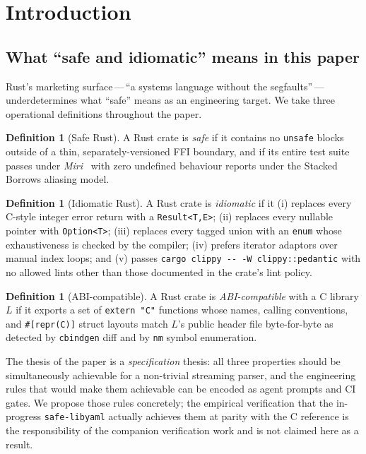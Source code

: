 \documentclass[12pt]{article}
\theoremstyle{definition}
\newtheorem{definition}[theorem]{Definition}
\theoremstyle{remark}
\begin{document}
\tableofcontents
\newpage

\section{Introduction}
\label{sec:intro}

\subsection{What ``safe and idiomatic'' means in this paper}

Rust's marketing surface\,---\,``a systems language without the segfaults''\,---\,
underdetermines what ``safe'' means as an engineering target. We take three
operational definitions throughout the paper.

\begin{definition}[Safe Rust]
\label{def:safe-rust}
A Rust crate is \emph{safe} if it contains no \texttt{unsafe} blocks outside of
a thin, separately-versioned FFI boundary, and if its entire test suite passes
under \emph{Miri}~\cite{miri-popl2026} with zero undefined behaviour reports
under the Stacked Borrows aliasing model.
\end{definition}

\begin{definition}[Idiomatic Rust]
\label{def:idiomatic-rust}
A Rust crate is \emph{idiomatic} if it (i) replaces every C-style integer error
return with a \texttt{Result<T,E>}; (ii) replaces every nullable pointer with
\texttt{Option<T>}; (iii) replaces every tagged union with an \texttt{enum}
whose exhaustiveness is checked by the compiler; (iv) prefers iterator
adaptors over manual index loops; and (v) passes \verb|cargo clippy -- -W clippy::pedantic|
with no allowed lints other than those documented
in the crate's lint policy.
\end{definition}

\begin{definition}[ABI-compatible]
\label{def:abi-compat}
A Rust crate is \emph{ABI-compatible} with a C library $L$ if it exports a set
of \texttt{extern "C"} functions whose names, calling conventions, and
\texttt{\#[repr(C)]} struct layouts match $L$'s public header file byte-for-byte
as detected by \texttt{cbindgen} diff and by \texttt{nm} symbol enumeration.
\end{definition}

The thesis of the paper is a \emph{specification} thesis: all three properties
should be simultaneously achievable for a non-trivial streaming parser, and
the engineering rules that would make them achievable can be encoded as
agent prompts and CI gates. We propose those rules concretely; the empirical
verification that the in-progress \texttt{safe-libyaml} actually achieves
them at parity with the C reference is the responsibility of the
companion verification work and is not claimed here as a result.
\end{document}
